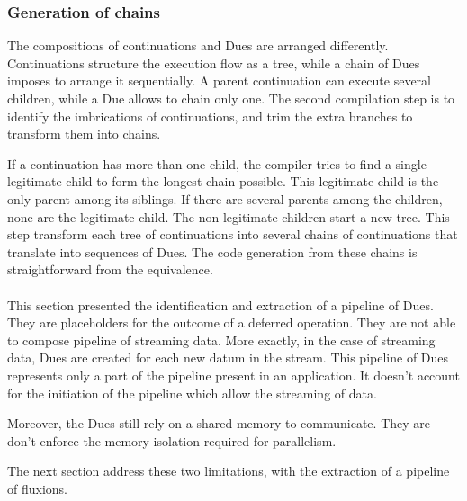 
\subsubsection{Generation of chains}

The compositions of continuations and Dues are arranged differently.
Continuations structure the execution flow as a tree, while a chain of Dues imposes to arrange it sequentially.
A parent continuation can execute several children, while a Due allows to chain only one.
The second compilation step is to identify the imbrications of continuations, and trim the extra branches to transform them into chains.

If a continuation has more than one child, the compiler tries to find a single legitimate child to form the longest chain possible.
This legitimate child is the only parent among its siblings.
If there are several parents among the children, none are the legitimate child.
The non legitimate children start a new tree.
This step transform each tree of continuations into several chains of continuations that translate into sequences of Dues.
The code generation from these chains is straightforward from the equivalence.

\paragraph{}

This section presented the identification and extraction of a pipeline of Dues.
They are placeholders for the outcome of a deferred operation.
They are not able to compose pipeline of streaming data.
More exactly, in the case of streaming data, Dues are created for each new datum in the stream.
This pipeline of Dues represents only a part of the pipeline present in an application.
It doesn't account for the initiation of the pipeline which allow the streaming of data.

Moreover, the Dues still rely on a shared memory to communicate.
They are don't enforce the memory isolation required for parallelism.

The next section address these two limitations, with the extraction of a pipeline of fluxions.